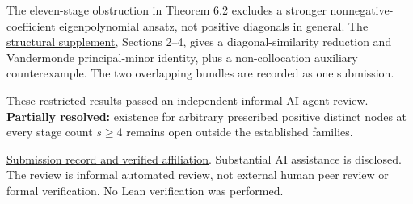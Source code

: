 \documentclass[11pt,a4paper]{article}
\begin{document}
The eleven-stage obstruction in Theorem 6.2 excludes a stronger
nonnegative-coefficient eigenpolynomial ansatz, not positive diagonals
in general. The
\href{https://github.com/ajt60gaibb/OpenProblemsInNLA/blob/main/references/holden-ie-extensions-2026-09-13/submitted/IE-28_verified_extensions/STRUCTURAL_REDUCTION.md}{structural
supplement}, Sections 2--4, gives a diagonal-similarity reduction and
Vandermonde principal-minor identity, plus a non-collocation auxiliary
counterexample. The two overlapping bundles are recorded as one
submission.

These restricted results passed an
\href{https://github.com/ajt60gaibb/OpenProblemsInNLA/blob/main/references/holden-ie-extensions-2026-09-13/verification/review-ie28.md}{independent
informal AI-agent review}. \textbf{Partially resolved:} existence for
arbitrary prescribed positive distinct nodes at every stage count
\(s\ge4\) remains open outside the established families.

\href{https://github.com/ajt60gaibb/OpenProblemsInNLA/blob/main/references/holden-ie-extensions-2026-09-13/README.md}{Submission
record and verified affiliation}. Substantial AI assistance is
disclosed. The review is informal automated review, not external human
peer review or formal verification. No Lean verification was performed.
\end{document}
